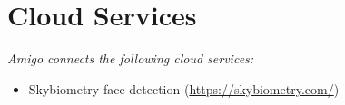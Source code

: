 \section*{Cloud Services}

\textit{Amigo connects the following cloud services:}
\begin{itemize}
   \item Skybiometry face detection (\url{https://skybiometry.com/})
\end{itemize} 